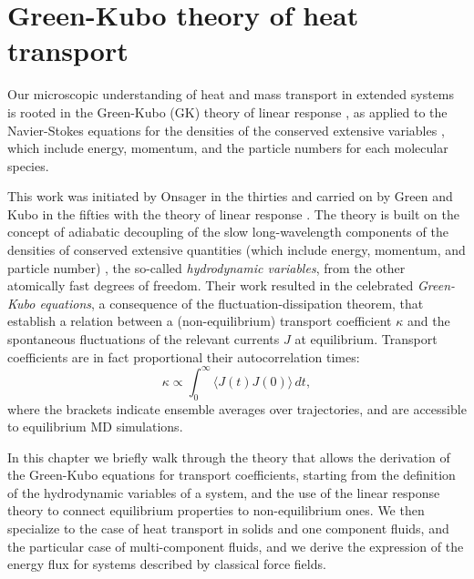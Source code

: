 \chapter{Green-Kubo theory of heat transport}  \label{ch:green-kubo}

Our microscopic understanding of heat and mass transport in extended systems is rooted in the Green-Kubo (GK) theory of linear response \cite{Green1954,Kubo1957a}, as applied to the Navier-Stokes equations for the densities of the conserved extensive variables \cite{Kadanoff1963,Forster1975}, which include energy, momentum, and the particle numbers for each molecular species. 
\begin{LEtext}

This work was initiated by Onsager in the thirties \cite{Onsager1931a,Onsager1931b} and carried on by Green and Kubo in the fifties with the theory of linear response \cite{Green1952,Green1954,Kubo1957a,Kubo1957b}. The theory is built on the concept of adiabatic decoupling of the slow long-wavelength components of the densities of conserved extensive quantities (which include energy, momentum, and particle number) \cite{Kadanoff1963}, the so-called \emph{hydrodynamic variables}, from the other atomically fast degrees of freedom. Their work resulted in the celebrated \emph{Green-Kubo equations}, a consequence of the fluctuation-dissipation theorem, that establish a relation between a (non-equilibrium) transport coefficient $\kappa$ and the spontaneous fluctuations of the relevant currents $J$ at equilibrium. Transport coefficients are in fact proportional their autocorrelation times:
\begin{equation}
\kappa\propto\int_{0}^{\infty}\!\langle{J}(t){J}(0)\rangle\, dt, \label{eq:GK}
\end{equation}
where the brackets indicate ensemble averages over trajectories, and are accessible to equilibrium MD simulations.

In this chapter we briefly walk through the theory that allows the derivation of the Green-Kubo equations for transport coefficients, starting from the definition of the hydrodynamic variables of a system, and the use of the linear response theory to connect equilibrium properties to non-equilibrium ones. We then specialize to the case of heat transport in solids and one component fluids, and the particular case of multi-component fluids, and we derive the expression of the energy flux for systems described by classical force fields.
\end{LEtext}


